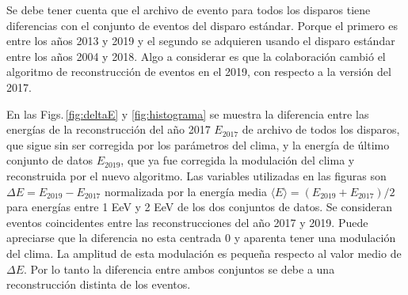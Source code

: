     Se debe tener cuenta que el archivo de evento para todos los disparos tiene diferencias con el conjunto de eventos del disparo estándar. Porque el primero es entre los años 2013 y 2019 y el segundo se adquieren usando el disparo estándar entre los años 2004 y 2018.  Algo a considerar es que la colaboración cambió el algoritmo de reconstrucción de eventos en el 2019, con respecto a la versión del 2017.  

    En las  Figs.\,\ref{fig:deltaE} y \ref{fig:histograma} se muestra la diferencia entre las energías de la reconstrucción del año 2017 $E_{2017}$ de archivo de todos los disparos, que sigue sin ser corregida por los parámetros del clima, y la energía de último conjunto de datos $E_{2019}$, que ya fue corregida la modulación del clima y reconstruida por el nuevo algoritmo. Las variables utilizadas en las figuras son $\Delta E = E_{2019} - E_{2017}$ normalizada por la energía media $\langle E \rangle= (E_{2019} +  E_{2017})/2 $ para energías entre 1 EeV y 2 EeV de los dos conjuntos de datos. Se consideran eventos coincidentes entre las reconstrucciones del año 2017 y 2019. Puede apreciarse que la diferencia no esta centrada 0 y aparenta tener una modulación del clima. La amplitud de esta modulación es pequeña respecto al valor medio de $\Delta E$. Por lo tanto la diferencia entre ambos conjuntos se debe a una reconstrucción distinta de los eventos. 

